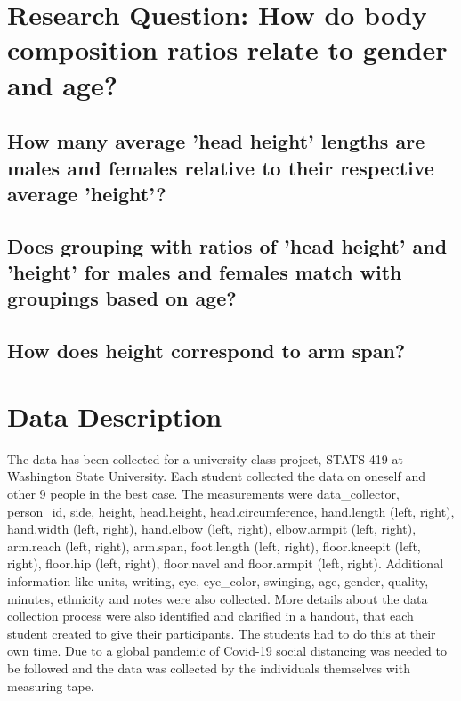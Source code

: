 \documentclass[]{article}
\begin{document}
\newpage

\section{Research Question: How do body composition ratios relate to gender and age?}
\label{sec:rq}

\subsection{How many average ’head height’ lengths are males and females relative to their respective average ’height’?}
\label{sec:rq2}

\subsection{Does grouping with ratios of 'head height' and 'height' for males and females match with groupings based on age?}
\label{sec:rq3}

\subsection{How does height correspond to arm span?}
\label{sec:rq4}

\section{Data Description}
\label{sec:data}

The data has been collected for a university class project, STATS 419 at
Washington State University. Each student collected the data on oneself
and other 9 people in the best case. The measurements were
data\_collector, person\_id, side, height, head.height,
head.circumference, hand.length (left, right), hand.width (left, right),
hand.elbow (left, right), elbow.armpit (left, right), arm.reach (left,
right), arm.span, foot.length (left, right), floor.kneepit (left,
right), floor.hip (left, right), floor.navel and floor.armpit (left,
right). Additional information like units, writing, eye, eye\_color,
swinging, age, gender, quality, minutes, ethnicity and notes were also
collected. More details about the data collection process were also
identified and clarified in a handout, that each student created to give
their participants. The students had to do this at their own time. Due
to a global pandemic of Covid-19 social distancing was needed to be
followed and the data was collected by the individuals themselves with
measuring tape.
\end{document}

